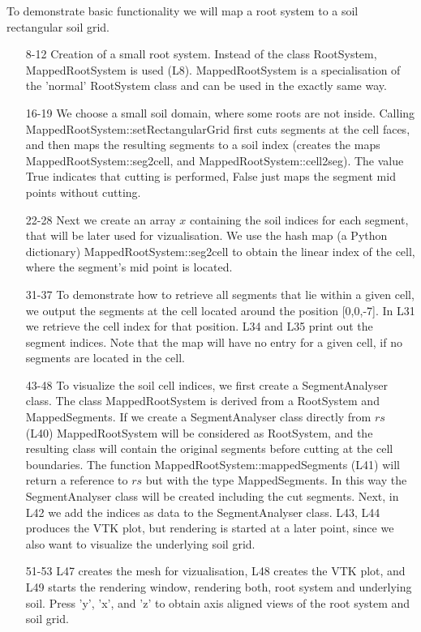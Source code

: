 To demonstrate basic functionality we will map a root system to a soil rectangular soil grid. 



\begin{itemize}

\item[8-12] Creation of a small root system. Instead of the class RootSystem, MappedRootSystem is used (L8). MappedRootSystem is a specialisation of the 'normal' RootSystem class and can be used in the exactly same way. 

\item[16-19] We choose a small soil domain, where some roots are not inside. Calling MappedRootSystem::setRectangularGrid first cuts segments at the cell faces, and then maps the resulting segments to a soil index (creates the maps MappedRootSystem::seg2cell, and MappedRootSystem::cell2seg). The value True indicates that cutting is performed, False just maps the segment mid points without cutting. 

\item[22-28] Next we create an array $x$ containing the soil indices for each segment, that will be later used for vizualisation. We use the hash map (a Python dictionary) MappedRootSystem::seg2cell to obtain the linear index of the cell, where the segment's mid point is located.

\item[31-37] To demonstrate how to retrieve all segments that lie within a given cell, we output the segments at the cell located around the position [0,0,-7]. In L31 we retrieve the cell index for that position. L34 and L35 print out the segment indices. Note that the map will have no entry for a given cell, if no segments are located in the cell. 

\item[43-48] To visualize the soil cell indices, we first create a SegmentAnalyser class. The class MappedRootSystem is derived from a RootSystem and MappedSegments. If we create a SegmentAnalyser class directly from $rs$ (L40) MappedRootSystem will be considered as RootSystem, and the resulting class will contain the original segments before cutting at the cell boundaries. The function MappedRootSystem::mappedSegments (L41) will return a reference to $rs$ but with the type MappedSegments. In this way the SegmentAnalyser class will be created including the cut segments. Next, in L42 we add the indices as data to the SegmentAnalyser class. L43, L44 produces the VTK plot, but rendering is started at a later point, since we also want to visualize the underlying soil grid.

\item[51-53]  L47 creates the mesh for vizualisation, L48 creates the VTK plot, and L49 starts the rendering window, rendering both, root system and underlying soil. Press 'y', 'x', and 'z' to obtain axis aligned views of the root system and soil grid.

\end{itemize}

